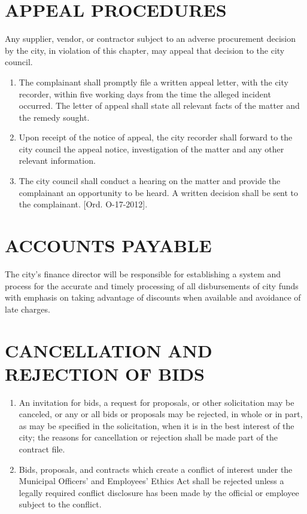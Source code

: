 \section{APPEAL PROCEDURES}
Any supplier, vendor, or contractor subject to an adverse procurement decision by the city, in violation of this chapter, may appeal that decision to the city council. 

\begin{enumerate}
	\item The complainant shall promptly file a written appeal letter, with the city recorder, within five working days from the time the alleged incident occurred. The letter of appeal shall state all relevant facts of the matter and the remedy sought. 
	\item Upon receipt of the notice of appeal, the city recorder shall forward to the city council the appeal notice, investigation of the matter and any other relevant information. 
	\item The city council shall conduct a hearing on the matter and provide the complainant an opportunity to be heard. A written decision shall be sent to the complainant. [Ord. O-17-2012]. 
\end{enumerate}

\pagebreak

\section{ACCOUNTS PAYABLE}
The city’s finance director will be responsible for establishing a system and process for the accurate and timely processing of all disbursements of city funds with emphasis on taking advantage of discounts when available and avoidance of late charges. 

\section{CANCELLATION AND REJECTION OF BIDS}
\begin{enumerate}
	\item An invitation for bids, a request for proposals, or other solicitation may be canceled, or any or all bids or proposals may be rejected, in whole or in part, as may be specified in the solicitation, when it is in the best interest of the city; the reasons for cancellation or rejection shall be made part of the contract file. 
	\item Bids, proposals, and contracts which create a conflict of interest under the Municipal Officers’ and Employees’ Ethics Act shall be rejected unless a legally required conflict disclosure has been made by the official or employee subject to the conflict. 
\end{enumerate}

